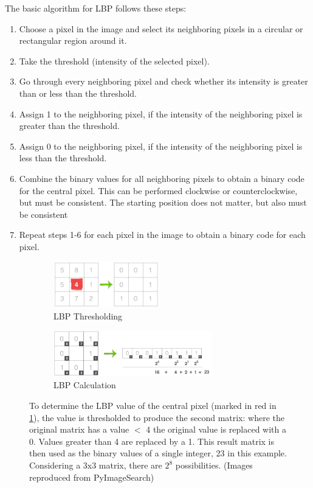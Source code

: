 \documentclass[letterpaper, notitlepage]{report}
\begin{document}
The basic algorithm for LBP follows these steps:
\begin{enumerate}
	\item{Choose a pixel in the image and select its neighboring pixels in a circular or rectangular region around it.}
	\item{Take the threshold (intensity of the selected pixel).}
	\item{Go through every neighboring pixel and check whether its intensity is greater than or less than the threshold.}
	\item{Assign 1 to the neighboring pixel, if the intensity of the neighboring pixel is greater than the threshold.}
	\item{Assign 0 to the neighboring pixel, if the intensity of the neighboring pixel is less than the threshold.}
	\item{Combine the binary values for all neighboring pixels to obtain a binary code for the central pixel. This can be performed clockwise or counterclockwise, but must be consistent. The starting position does not matter, but also must be consistent}
	\item{Repeat steps 1-6 for each pixel in the image to obtain a binary code for each pixel.}
\end{enumerate}

\begin{figure}[H]
	\begin{subfigure}[h]{0.48\linewidth}
		\centering
		\includegraphics[height=2cm]{./figures/lbp_thresholding.jpg}
		\caption{LBP Thresholding}
		\label{subfig:lbp-thresholding}	
	\end{subfigure}
	\hfill
	\begin{subfigure}[h]{0.48\linewidth}
		\centering
		\includegraphics[height=2cm]{./figures/lbp_calculation.jpg}
		\caption{LBP Calculation}
		\label{subfig:lbp-calculation}		
	\end{subfigure}%
	\caption[Local Binary Pattern thresholding and calculation]{To determine the LBP value of the central pixel (marked in red in \ref{subfig:lbp-thresholding}), the value is thresholded to produce the second matrix: where the original matrix has a value $<$ 4 the original value is replaced with a 0. Values greater than 4 are replaced by a 1. This result matrix is then used as the binary values of a single integer, 23 in this example. Considering a 3x3 matrix, there are $2^8$ possibilities. (Images reproduced from PyImageSearch)}
	\label{fig:lbp}
\end{figure}
\end{document}
